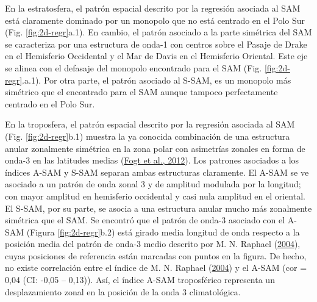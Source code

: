 \documentclass[12pt,oneside,a4paper]{reedthesis}
\begin{document}
En la estratosfera, el patrón espacial descrito por la regresión asociada al SAM está claramente dominado por un monopolo que no está centrado en el Polo Sur (Fig. \ref{fig:2d-regr}a.1).
En cambio, el patrón asociado a la parte simétrica del SAM se caracteriza por una estructura de onda-1 con centros sobre el Pasaje de Drake en el Hemisferio Occidental y el Mar de Davis en el Hemisferio Oriental.
Este eje se alinea con el defasaje del monopolo encontrado para el SAM (Fig. \ref{fig:2d-regr}.a.1).
Por otra parte, el patrón asociado al S-SAM, es un monopolo más simétrico que el encontrado para el SAM aunque tampoco perfectamente centrado en el Polo Sur.

En la troposfera, el patrón espacial descrito por la regresión asociada al SAM (Fig. \ref{fig:2d-regr}b.1) muestra la ya conocida combinación de una estructura anular zonalmente simétrica en la zona polar con asimetrías zonales en forma de onda-3 en las latitudes medias (\protect\hyperlink{ref-fogt2012}{Fogt et al., 2012}).
Los patrones asociados a los índices A-SAM y S-SAM separan ambas estructuras claramente.
El A-SAM se ve asociado a un patrón de onda zonal 3 y de amplitud modulada por la longitud; con mayor amplitud en hemisferio occidental y casi nula amplitud en el oriental.
El S-SAM, por su parte, se asocia a una estructura anular mucho más zonalmente simétrica que el SAM.
Se encontró que el patrón de onda-3 asociado con el A-SAM (Figura \ref{fig:2d-regr}b.2) está girado media longitud de onda respecto a la posición media del patrón de onda-3 medio descrito por M. N. Raphael (\protect\hyperlink{ref-raphael2004}{2004}), cuyas posiciones de referencia están marcadas con puntos en la figura.
De hecho, no existe correlación entre el índice de M. N. Raphael (\protect\hyperlink{ref-raphael2004}{2004}) y el A-SAM (cor = 0,04 (CI: -0,05 -- 0,13)).
Así, el índice A-SAM troposférico representa un desplazamiento zonal en la posición de la onda 3 climatológica.
\end{document}
